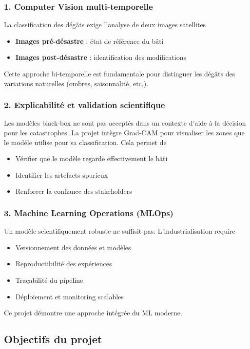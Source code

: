 \documentclass[12pt,a4paper]{article}
\begin{document}
\subsubsection{1. Computer Vision multi-temporelle}
La classification des dégâts exige l'analyse de deux images satellites\:
\begin{itemize}
    \item \textbf{Images pré-désastre} : état de référence du bâti
    \item \textbf{Images post-désastre} : identification des modifications
\end{itemize}

Cette approche bi-temporelle est fundamentale pour distinguer les dégâts des variations naturelles (ombres, saisonnalité, etc.).

\subsubsection{2. Explicabilité et validation scientifique}
Les modèles black-box ne sont pas acceptés dans un contexte d'aide à la décision pour les catastrophes. La projet intègre Grad-CAM pour visualiser les zones que le modèle utilise pour sa classification. Cela permet de\:
\begin{itemize}
    \item Vérifier que le modèle regarde effectivement le bâti
    \item Identifier les artefacts spurieux
    \item Renforcer la confiance des stakeholders
\end{itemize}

\subsubsection{3. Machine Learning Operations (MLOps)}
Un modèle scientifiquement robuste ne suffisit pas. L'industrialisation require\:
\begin{itemize}
    \item Versionnement des données et modèles
    \item Reproductibilité des expériences
    \item Traçabilité du pipeline
    \item Déploiement et monitoring scalables
\end{itemize}

Ce projet démontre une approche intégrée du ML moderne.

\subsection{Objectifs du projet}
\end{document}
